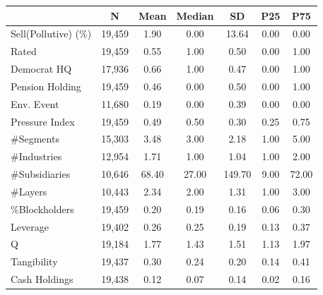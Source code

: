 {
\def\sym#1{\ifmmode^{#1}\else\(^{#1}\)\fi}
\begin{tabular}{l*{1}{cccccc}}
\toprule
                       &           N&        Mean&      Median&          SD&         P25&         P75\\
\midrule
Sell(Pollutive) (\%)   &      19,459&        1.90&        0.00&       13.64&        0.00&        0.00\\
Rated                  &      19,459&        0.55&        1.00&        0.50&        0.00&        1.00\\
Democrat HQ            &      17,936&        0.66&        1.00&        0.47&        0.00&        1.00\\
Pension Holding        &      19,459&        0.46&        0.00&        0.50&        0.00&        1.00\\
Env. Event             &      11,680&        0.19&        0.00&        0.39&        0.00&        0.00\\
Pressure Index         &      19,459&        0.49&        0.50&        0.30&        0.25&        0.75\\
\#Segments             &      15,303&        3.48&        3.00&        2.18&        1.00&        5.00\\
\#Industries           &      12,954&        1.71&        1.00&        1.04&        1.00&        2.00\\
\#Subsidiaries         &      10,646&       68.40&       27.00&      149.70&        9.00&       72.00\\
\#Layers               &      10,443&        2.34&        2.00&        1.31&        1.00&        3.00\\
\%Blockholders         &      19,459&        0.20&        0.19&        0.16&        0.06&        0.30\\
Leverage               &      19,402&        0.26&        0.25&        0.19&        0.13&        0.37\\
Q                      &      19,184&        1.77&        1.43&        1.51&        1.13&        1.97\\
Tangibility            &      19,437&        0.30&        0.24&        0.20&        0.14&        0.41\\
Cash Holdings          &      19,438&        0.12&        0.07&        0.14&        0.02&        0.16\\
\bottomrule
\end{tabular}
}
